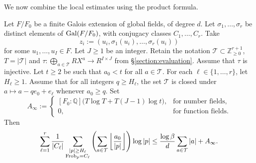 \documentclass[reqno]{amsart} 
\begin{document}
We now combine the local estimates using the product formula.
\begin{proposition}\label{proposition:cus6m68zjr}
  Let $F/F_0$ be a finite Galois extension of global fields, of degree $d$.  Let $\sigma_1,\dotsc,\sigma_r$ be distinct elements of $\operatorname{Gal}(F/F_0)$, with conjugacy classes $C_1,\dotsc,C_r$.  Take
  \begin{equation*}
    z_i:=(u_i,\sigma_1(u_i),\dotsc,\sigma_r(u_i))
  \end{equation*}
  for some $u_1, \dotsc, u_I \in F$.  Let $J \geq 1$ be an integer.  Retain the notation $\mathcal{T} \subset \mathbb{Z}_{\geq 0}^{r + 1}$, $T = \lvert \mathcal{T} \rvert$ and $\tau : \bigoplus_{a \in \mathcal{T}} R X^a \rightarrow R^{I \times J}$ from \S\ref{section:evaluation}.  Assume that $\tau$ is injective.  Let $t\geq2$ be such that $a_0<t$ for all $a \in \mathcal{T}$.  For each $\ell \in \{1, \dotsc, r\}$, let $H_\ell\geq1$.  Assume that for all integers $q\geq H_\ell$, the set $\mathcal{T}$ is closed under $a\mapsto a-qe_0+e_\ell$ whenever $a_0\geq q$.  Set
  \begin{equation}\label{eq:cus6oc79wo}
    A_\infty :=
    \begin{cases}
      [F_0:\mathbb{Q}]\bigl(T\log T+T(J-1)\log t\bigr),&\text{for number fields},\\
      0,&\text{for function fields}.
    \end{cases}
  \end{equation}
  Then
  \begin{equation}\label{eq:general-global-bound}
    \sum_{\ell=1}^r\frac{1}{|C_\ell|}
    \sum_{\substack{|p|\geq H_\ell\\\operatorname{Frob}_p=C_\ell}}
    \left(\sum_{a\in\mathcal{T}}\left\lfloor\frac{a_0}{|p|}\right\rfloor\right)\log|p|
    \leq \frac{\log\beta}{d}\sum_{a\in\mathcal{T}}|a|+A_\infty.
  \end{equation}
\end{proposition}
\end{document}
